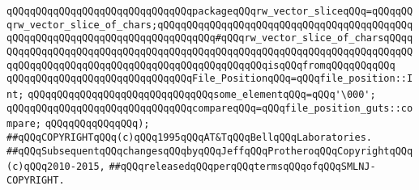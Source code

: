 \verb|qQQqqQQqqQQqqQQqqQQqqQQqqQQqqQQqpackageqQQqrw_vector_sliceqQQq=qQQqqQQqrw_vector_slice_of_chars;qQQqqQQqqQQqqQQqqQQqqQQqqQQqqQQqqQQqqQQqqQQqqQQqqQQqqQQqqQQqqQQqqQQqqQQqqQQqqQQq#qQQqrw_vector_slice_of_charsqQQqqQQqqQQqqQQqqQQqqQQqqQQqqQQqqQQqqQQqqQQqqQQqqQQqqQQqqQQqqQQqqQQqqQQqqQQqqQQqqQQqqQQqqQQqqQQqqQQqqQQqqQQqqQQqqQQqqQQqisqQQqfromqQQqqQQqqQQq|\newline
\newline
\verb|qQQqqQQqqQQqqQQqqQQqqQQqqQQqqQQqFile_PositionqQQq=qQQqfile_position::Int;|\newline
\newline
\verb|qQQqqQQqqQQqqQQqqQQqqQQqqQQqqQQqsome_elementqQQq=qQQq'\000';|\newline
\newline
\verb|qQQqqQQqqQQqqQQqqQQqqQQqqQQqqQQqcompareqQQq=qQQqfile_position_guts::compare;|\newline
\verb|qQQqqQQqqQQqqQQq);|\newline
\newline
\newline
\newline
\newline
\newline
\verb|##qQQqCOPYRIGHTqQQq(c)qQQq1995qQQqAT&TqQQqBellqQQqLaboratories.|\newline
\verb|##qQQqSubsequentqQQqchangesqQQqbyqQQqJeffqQQqProtheroqQQqCopyrightqQQq(c)qQQq2010-2015,|\newline
\verb|##qQQqreleasedqQQqperqQQqtermsqQQqofqQQqSMLNJ-COPYRIGHT.|\newline

